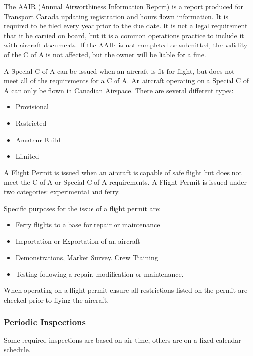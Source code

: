 \documentclass[12pt,letterpaper]{article}
\begin{document}
    The AAIR (Annual Airworthiness Information Report) is a report produced for Transport Canada updating registration and hours flown information. It is required to be filed every year prior to the due date. It is not a legal requirement that it be carried on board, but it is a common operations practice to include it with aircraft documents. If the AAIR is not completed or submitted, the validity of the C of A is not affected, but the owner will be liable for a fine.

    A Special C of A can be issued when an aircraft is fit for flight, but does not meet all of the requirements for a C of A.  An aircraft operating on a Special C of A can only be flown in Canadian Airspace. There are several different types:
    \begin{itemize}
        \item Provisional
        \item Restricted
        \item Amateur Build
        \item Limited
    \end{itemize}

    A Flight Permit is issued when an aircraft is capable of safe flight but does not meet the C of A or Special C of A requirements.  A Flight Permit is issued under two categories: experimental and ferry.
    
    Specific purposes for the issue of a flight permit are:
    \begin{itemize}
        \item Ferry flights to a base for repair or maintenance
        \item Importation or Exportation of an aircraft
        \item Demonstrations, Market Survey, Crew Training
        \item Testing following a repair, modification or maintenance.
    \end{itemize}
    
    When operating on a flight permit ensure all restrictions listed on the permit are checked prior to flying the aircraft.

    \subsubsection{Periodic Inspections}
    \label{subsection:periodic}
    
    Some required inspections are based on air time, others are on a fixed calendar schedule.
    
\end{document}
